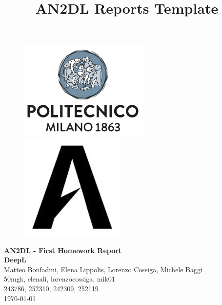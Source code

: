 \documentclass[11pt]{article}
\title{AN2DL Reports Template}
\begin{document}
    
    \begin{figure}[H]
        \raggedright
        \includegraphics[scale=0.4]{polimi.png} \hfill \includegraphics[scale=0.3]{airlab.jpeg}
    \end{figure}
    
    \vspace{5mm}
    
    \begin{center}
        {\Large \textbf{AN2DL - First Homework Report}}\\
        \vspace{2mm}
        {\Large \textbf{DeepL}}\\
        \vspace{2mm}
        {\large Matteo Bonfadini,}
        {\large Elena Lippolis,}
        {\large Lorenzo Cossiga,}
        {\large Michele Baggi}\\
        \vspace{2mm}
        {50mgk,}
        {elenali,}
        {lorenzocossiga,}
        {mik01}\\
        \vspace{2mm}
        {243786,}
        {252310,}
        {242309,}
        {252119}\\
        \vspace{5mm}
        \today
    \end{center}    
    \vspace{5mm}
    
\end{document}
